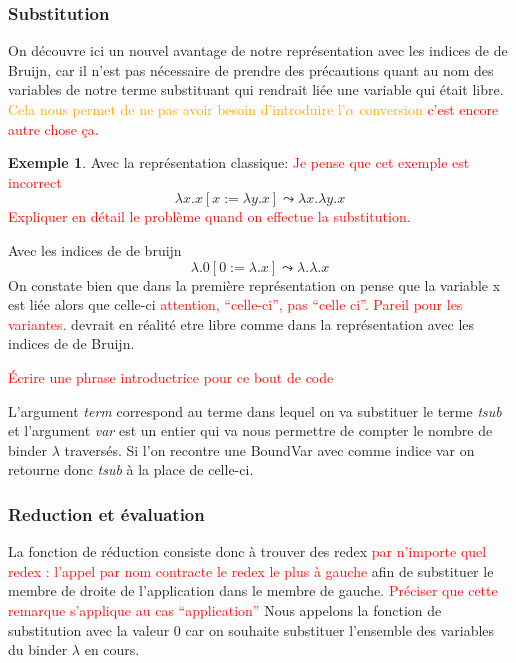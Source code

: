 \documentclass {article}
\newcommand{\codefrom}[3]
           {}
\theoremstyle{definition}
\newtheorem{example}{Exemple}
\theoremstyle{remark}
\newcommand{\todo}[1]{\textcolor{red}{#1}}
\newcommand{\attention}[1]{\textcolor{orange}{#1}}
\begin{document}
\subsubsection{Substitution}

On découvre ici un nouvel avantage de notre représentation avec les indices de
de Bruijn, car il n'est pas nécessaire de prendre des précautions quant au
nom des variables de notre terme substituant %
qui rendrait liée une variable qui était libre. \attention{Cela nous permet de ne pas 
avoir besoin d'introduire l'\(\alpha\) conversion} \todo{c'est encore autre chose ça.}

\begin{example}
  Avec la représentation classique: \todo{Je pense que cet exemple est incorrect}
  \[ 
  \lambda x.x[x := \lambda y.x]\leadsto\lambda x.\lambda y.x
  \]
  \todo{Expliquer en détail le problème quand on effectue la substitution.}

  Avec les indices de de bruijn
  \[ 
  \lambda.0[0 := \lambda.x]\leadsto\lambda.\lambda.x
  \]
  On constate bien que dans la première représentation on pense que la variable
  x est liée alors que celle-ci \todo{attention, ``celle-ci'', pas ``celle ci''. Pareil pour les variantes.} devrait en réalité etre libre comme dans la 
  représentation avec les indices de de Bruijn.
\end{example}

\todo{Écrire une phrase introductrice pour ce bout de code}

\codefrom{untyped}{lambda}{substitution}

L'argument \emph{term} correspond au terme dans lequel on va substituer le terme \emph{tsub} et 
l'argument \emph{var} est un entier qui va nous permettre de compter le nombre de binder \(\lambda\)
traversés. Si l'on recontre une BoundVar avec comme indice var on retourne donc \emph{tsub} à la 
place de celle-ci.


\subsubsection{Reduction et évaluation}
La fonction de réduction consiste donc à trouver des redex \todo{par
  n'importe quel redex : l'appel par nom contracte le redex le plus à
  gauche} afin de substituer le membre de droite de l'application dans
le membre de gauche. \todo{Préciser que cette remarque s'applique au cas ``application''} Nous appelons la fonction de substitution  avec la
valeur \(0\) car on souhaite substituer l'ensemble des variables du binder
\(\lambda\) en cours.
\end{document}
